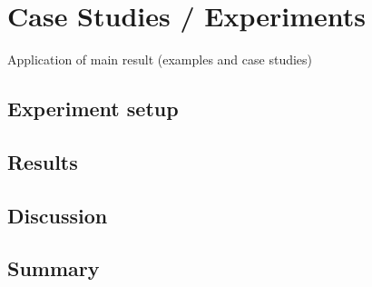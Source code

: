 \chapter{Case Studies / Experiments}
		Application of main result (examples and case studies)
	\section{Experiment setup}
    \section{Results}
    \section{Discussion}
	\section{Summary}